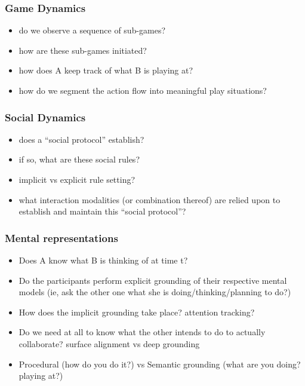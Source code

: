 \documentclass{article}
\begin{document}
\subsubsection{Game Dynamics}

\begin{itemize}
    \item do we observe a sequence of sub-games?
    \item how are these sub-games initiated?
    \item how does A keep track of what B is playing at?
    \item how do we segment the action flow into meaningful play situations?
\end{itemize}

\subsubsection{Social Dynamics}

\begin{itemize}
    \item does a ``social protocol'' establish?
    \item if so, what are these social rules?
    \item implicit vs explicit rule setting?
    \item what interaction modalities (or combination thereof) are relied upon
        to establish and maintain this ``social protocol''?
\end{itemize}

\subsubsection{Mental representations}

\begin{itemize}
    \item Does A know what B is thinking of at time t?
    \item Do the participants perform explicit grounding of their respective mental models
        (ie, ask the other one what she is doing/thinking/planning to do?)
    \item How does the implicit grounding take place? attention tracking?
    \item Do we need at all to know what the other intends to do to actually
        collaborate? surface alignment vs deep grounding
    \item Procedural (how do you do it?) vs Semantic
        grounding (what are you doing? playing at?)
\end{itemize}
\end{document}
